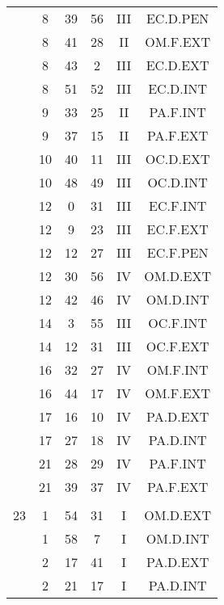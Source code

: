 \documentclass[12pt, a4paper]{article}
\begin{document}
\begin{multicols}{3}
{\begin{tabular}{c c c c c c}
	 	 	 	 & 8 & 39 & 56 & III & EC.D.PEN\\%
	 	 	 	 & 8 & 41 & 28 & II & OM.F.EXT\\%
	 	 	 	 & 8 & 43 & 2 & III & EC.D.EXT\\%
	 	 	 	 & 8 & 51 & 52 & III & EC.D.INT\\%
	 	 	 	 & 9 & 33 & 25 & II & PA.F.INT\\%
	 	 	 	 & 9 & 37 & 15 & II & PA.F.EXT\\%
	 	 	 	 & 10 & 40 & 11 & III & OC.D.EXT\\%
	 	 	 	 & 10 & 48 & 49 & III & OC.D.INT\\%
	 	 	 	 & 12 & 0 & 31 & III & EC.F.INT\\%
	 	 	 	 & 12 & 9 & 23 & III & EC.F.EXT\\%
	 	 	 	 & 12 & 12 & 27 & III & EC.F.PEN\\%
	 	 	 	 & 12 & 30 & 56 & IV & OM.D.EXT\\%
	 	 	 	 & 12 & 42 & 46 & IV & OM.D.INT\\%
	 	 	 	 & 14 & 3 & 55 & III & OC.F.INT\\%
	 	 	 	 & 14 & 12 & 31 & III & OC.F.EXT\\%
	 	 	 	 & 16 & 32 & 27 & IV & OM.F.INT\\%
	 	 	 	 & 16 & 44 & 17 & IV & OM.F.EXT\\%
	 	 	 	 & 17 & 16 & 10 & IV & PA.D.EXT\\%
	 	 	 	 & 17 & 27 & 18 & IV & PA.D.INT\\%
	 	 	 	 & 21 & 28 & 29 & IV & PA.F.INT\\%
	 	 	 	 & 21 & 39 & 37 & IV & PA.F.EXT\\%
	 	 	 	 & & & & & \\%
	 	 	 	23 & 1 & 54 & 31 & I & OM.D.EXT\\%
	 	 	 	 & 1 & 58 & 7 & I & OM.D.INT\\%
	 	 	 	 & 2 & 17 & 41 & I & PA.D.EXT\\%
	 	 	 	 & 2 & 21 & 17 & I & PA.D.INT\\%
	 	 \end{tabular}
 	}
\end{multicols}
\end{document}
